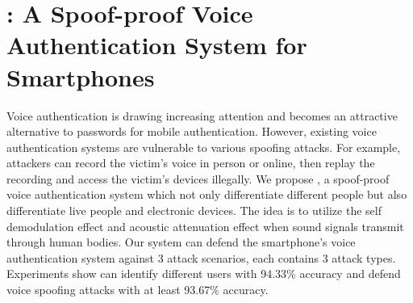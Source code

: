 \chapter{{\mv}: A Spoof-proof Voice Authentication System for Smartphones}

	Voice authentication is drawing increasing attention and becomes an attractive alternative to passwords for mobile authentication. However, existing voice authentication systems are vulnerable to various spoofing attacks. For example, attackers can record the victim's voice in person or online, then replay the recording and access the victim's devices illegally. 
We propose \shortname, a spoof-proof voice authentication system which not only differentiate different people but also differentiate live people and electronic devices. The idea is to utilize the self demodulation effect and acoustic attenuation effect when sound signals transmit through human bodies. Our system can defend the smartphone's voice authentication system against 3 attack scenarios, each contains 3 attack types. Experiments show  {\shortname} can identify different users with 94.33\% accuracy and defend voice spoofing attacks with at least 93.67\% accuracy. 

















